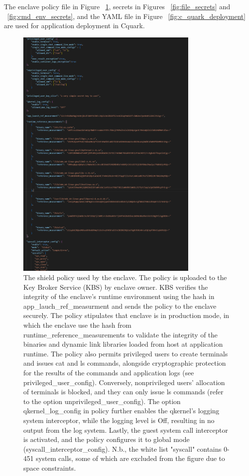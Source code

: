The enclave policy file in Figure ~\ref{fig:generic_policy}, secrets in Figures ~\ref{fig:file_secrets}  and ~\ref{fig:cmd_env_secrets}, and the YAML file in Figure ~\ref{fig:c_quark_deployment}  are used for 
application deployment in Cquark. 
\begin{figure}[H]
    \centering
    \includegraphics[width=0.8\textwidth, scale=0.8]{images/generic_policy.PNG}
    \caption[Qkernel Attestation Report Syscall Benchmark Deployment]{The shield policy used by the enclave.  The policy is uploaded to the Key Broker Service (KBS) by enclave owner. KBS verifies the integrity of the enclave's runtime environment 
    using the hash in app{\_}lauch{\_}ref{\_}measurment and sends the policy to the enclave securely. The policy stipulates that enclave is in production mode, in which the enclave use the hash from runtime\_reference\_measurements to validate the 
    integrity of the binaries and dynamic link libraries loaded from host at application runtime. The policy also permits privileged users to create terminals and issues cat and ls commands, alongside cryptographic protection for the results 
    of the commands and application logs (see privileged{\_}user{\_}config). Conversely, non{\-}privileged users' allocation of terminals is blocked, and they can only issue ls commands (refer to the option unprivileged{\_}user{\_}config). The option 
    qkernel\_log\_config in policy further enables the qkernel's logging system interceptor, while the logging level is Off, resulting in no output from the log system. Lastly, the guest system call interceptor is activated, and the policy configures 
    it to global mode (syscall{\_}interceptor{\_}config). N.b., the white list "syscall" contains 0-451 system calls, some of which are excluded from the figure due to space constraints.}
    \label{fig:generic_policy}
\end{figure}
